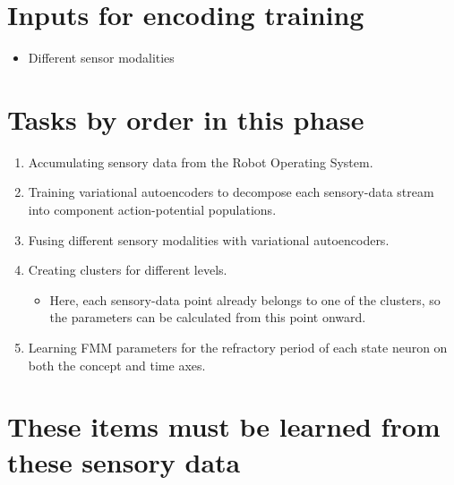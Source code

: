 \documentclass[a4paper]{article}
\begin{document}
   \section{Inputs for encoding training}

      \begin{itemize}

         \item Different sensor modalities

      \end{itemize}

   \section{Tasks by order in this phase}

      \begin{enumerate}

         \item Accumulating sensory data from the Robot Operating System.
         \item Training variational autoencoders to decompose each sensory-data stream into component action-potential populations.

         \item Fusing different sensory modalities with variational autoencoders.

         \item Creating clusters for different levels.

         \begin{itemize}

            \item Here, each sensory-data point already belongs to one of the clusters, so the parameters can be calculated from this point onward.

         \end{itemize}

         \item Learning FMM parameters for the refractory period of each state neuron on both the concept and time axes.

      \end{enumerate}

   \section{These items must be learned from these sensory data}
\end{document}
